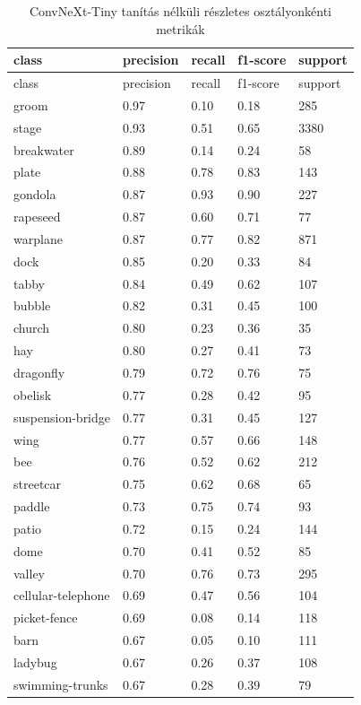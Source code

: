 \begin{center}
\begin{longtable}{lllll}
\caption{ConvNeXt-Tiny tanítás nélküli részletes osztályonkénti metrikák}\label{tab:phase1_ConvNeXt-Tiny_class_table}\\
\toprule
class & precision & recall & f1-score & support \\
\midrule
\endfirsthead
\toprule
class & precision & recall & f1-score & support \\
\midrule
\endhead
groom & 0.97 & 0.10 & 0.18 & 285 \\
stage & 0.93 & 0.51 & 0.65 & 3380 \\
breakwater & 0.89 & 0.14 & 0.24 & 58 \\
plate & 0.88 & 0.78 & 0.83 & 143 \\
gondola & 0.87 & 0.93 & 0.90 & 227 \\
rapeseed & 0.87 & 0.60 & 0.71 & 77 \\
warplane & 0.87 & 0.77 & 0.82 & 871 \\
dock & 0.85 & 0.20 & 0.33 & 84 \\
tabby & 0.84 & 0.49 & 0.62 & 107 \\
bubble & 0.82 & 0.31 & 0.45 & 100 \\
church & 0.80 & 0.23 & 0.36 & 35 \\
hay & 0.80 & 0.27 & 0.41 & 73 \\
dragonfly & 0.79 & 0.72 & 0.76 & 75 \\
obelisk & 0.77 & 0.28 & 0.42 & 95 \\
suspension-bridge & 0.77 & 0.31 & 0.45 & 127 \\
wing & 0.77 & 0.57 & 0.66 & 148 \\
bee & 0.76 & 0.52 & 0.62 & 212 \\
streetcar & 0.75 & 0.62 & 0.68 & 65 \\
paddle & 0.73 & 0.75 & 0.74 & 93 \\
patio & 0.72 & 0.15 & 0.24 & 144 \\
dome & 0.70 & 0.41 & 0.52 & 85 \\
valley & 0.70 & 0.76 & 0.73 & 295 \\
cellular-telephone & 0.69 & 0.47 & 0.56 & 104 \\
picket-fence & 0.69 & 0.08 & 0.14 & 118 \\
barn & 0.67 & 0.05 & 0.10 & 111 \\
ladybug & 0.67 & 0.26 & 0.37 & 108 \\
swimming-trunks & 0.67 & 0.28 & 0.39 & 79 \\

\end{longtable}
\end{center}

